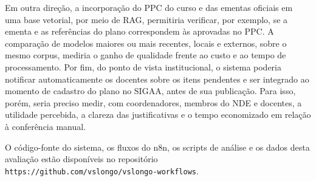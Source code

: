 Em outra direção, a incorporação do PPC do curso e das ementas oficiais em uma base vetorial, por meio de RAG, permitiria verificar, por exemplo, se a ementa e as referências do plano correspondem às aprovadas no PPC. A comparação de modelos maiores ou mais recentes, locais e externos, sobre o mesmo corpus, mediria o ganho de qualidade frente ao custo e ao tempo de processamento. Por fim, do ponto de vista institucional, o sistema poderia notificar automaticamente os docentes sobre os itens pendentes e ser integrado ao momento de cadastro do plano no SIGAA, antes de sua publicação. Para isso, porém, seria preciso medir, com coordenadores, membros do NDE e docentes, a utilidade percebida, a clareza das justificativas e o tempo economizado em relação à conferência manual.

O código-fonte do sistema, os fluxos do n8n, os scripts de análise e os dados desta avaliação estão disponíveis no repositório \texttt{https://github.com/vslongo/vslongo-workflows}.
